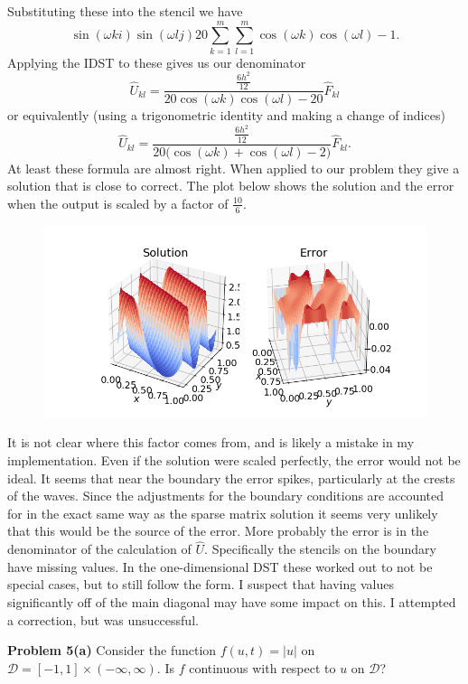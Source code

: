 \documentclass[12pt]{article}
\newcommand{\problem}[1]{\hspace{-4 ex} \large \textbf{Problem #1} }
\begin{document}
Substituting these into the stencil we have
$$
\sin(\omega ki)\sin(\omega lj) 20\sum_{k=1}^m\sum_{l=1}^m \cos(\omega k)\cos(\omega l) - 1.
$$
Applying the IDST to these gives us our denominator
$$
\hat{U}_{kl} = \frac{\frac{6h^2}{12}}{20\cos(\omega k)\cos(\omega l) - 20} \hat{F}_{kl}
$$
or equivalently (using a trigonometric identity and making a change of indices)
$$
\hat{U}_{kl} = \frac{\frac{6h^2}{12}}{20\big(\cos(\omega k) + \cos(\omega l) - 2\big)} \hat{F}_{kl}.
$$
At least these formula are almost right. When applied to our problem they give a solution that is close to correct. The plot below shows the solution and the error when the output is scaled by a factor of $\frac{10}{6}$. 
\begin{figure}[H]
	\centering
	\includegraphics[width=1\linewidth]{hw4_p4_c}
\end{figure}
It is not clear where this factor comes from, and is likely a mistake in my implementation. Even if the solution were scaled perfectly, the error would not be ideal. It seems that near the boundary the error spikes, particularly at the crests of the waves. Since the adjustments for the boundary conditions are accounted for in the exact same way as the sparse matrix solution it seems very unlikely that this would be the source of the error. More probably the error is in the denominator of the calculation of $\hat{U}$. Specifically the stencils on the boundary have missing values. In the one-dimensional DST these worked out to not be special cases, but to still follow the form. I suspect that having values significantly off of the main diagonal may have some impact on this. I attempted a correction, but was unsuccessful.


\bigbreak
\problem{5(a)} Consider the function $f(u,t) = |u|$ on $\mathcal{D}=[-1,1] \times (-\infty, \infty)$. Is $f$ continuous with respect to $u$ on $\mathcal{D}$? \bigbreak
\end{document}
